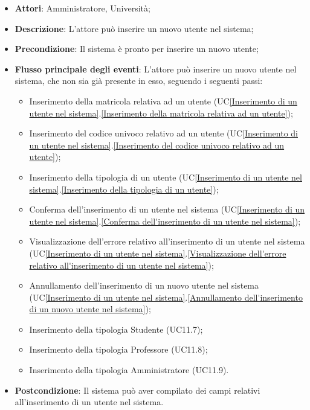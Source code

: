 \begin{itemize}
	\item \textbf{Attori}: Amministratore, Università;
	\item \textbf{Descrizione}: L'attore può inserire un nuovo utente nel sistema;
	\item \textbf{Precondizione}: Il sistema è pronto per inserire un nuovo utente;
	\item \textbf{Flusso principale degli eventi}: L'attore può inserire un nuovo utente nel sistema, che non sia già presente in esso, seguendo i seguenti passi:
	\begin{itemize}
		\item Inserimento della matricola relativa ad un utente (UC\ref{Inserimento di un utente nel sistema}.\ref{Inserimento della matricola relativa ad un utente});
		\item Inserimento del codice univoco relativo ad un utente (UC\ref{Inserimento di un utente nel sistema}.\ref{Inserimento del codice univoco relativo ad un utente});
		\item Inserimento della tipologia di un utente (UC\ref{Inserimento di un utente nel sistema}.\ref{Inserimento della tipologia di un utente});
		\item Conferma dell'inserimento di un utente nel sistema (UC\ref{Inserimento di un utente nel sistema}.\ref{Conferma dell'inserimento di un utente nel sistema});
		\item Visualizzazione dell'errore relativo all'inserimento di un utente nel sistema (UC\ref{Inserimento di un utente nel sistema}.\ref{Visualizzazione dell'errore relativo all'inserimento di un utente nel sistema});
		\item Annullamento dell'inserimento di un nuovo utente nel sistema (UC\ref{Inserimento di un utente nel sistema}.\ref{Annullamento dell'inserimento di un nuovo utente nel sistema});
		\item Inserimento della tipologia Studente (UC11.7);
		\item Inserimento della tipologia Professore (UC11.8);
		\item Inserimento della tipologia Amministratore (UC11.9).
	\end{itemize}
	\item \textbf{Postcondizione}: Il sistema può aver compilato dei campi relativi all'inserimento di un utente nel sistema.
	
\end{itemize}

